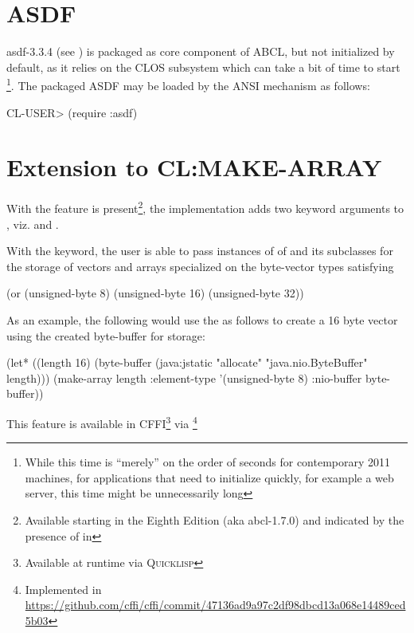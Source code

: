 \documentclass[10pt]{book}
\begin{document}
\section{ASDF}

asdf-3.3.4 (see \cite{asdf}) is packaged as core component of \textsc{ABCL},
but not initialized by default, as it relies on the \textsc{CLOS} subsystem
which can take a bit of time to start \footnote{While this time is
  ``merely'' on the order of seconds for contemporary 2011 machines,
  for applications that need to initialize quickly, for example a web
  server, this time might be unnecessarily long}.  The packaged \textsc{ASDF}
may be loaded by the \textsc{ANSI}  mechanism as
follows:

\begin{listing-lisp}
CL-USER> (require :asdf)
\end{listing-lisp}

\section{Extension to CL:MAKE-ARRAY}
\label{sec:make-array}

With the  feature is present\footnote{Available starting in
the Eighth Edition (aka abcl-1.7.0) and indicated by the presence of
 in }, the implementation adds two
keyword arguments to , viz.  and
.

With the  keyword, the user is able to pass
instances of of  and its subclasses for the
storage of vectors and arrays specialized on the byte-vector
types satisfying

\begin{listing-lisp}
  (or
    (unsigned-byte 8)
    (unsigned-byte 16)
    (unsigned-byte 32))
\end{listing-lisp}

As an example, the following would use the  as
follows to create a 16 byte vector using the created byte-buffer for
storage:

\begin{listing-lisp}
  (let* ((length 16)
         (byte-buffer (java:jstatic "allocate" "java.nio.ByteBuffer" length)))
    (make-array length :element-type '(unsigned-byte 8) :nio-buffer byte-buffer))
\end{listing-lisp}

This feature is available in CFFI\footnote{Available at runtime via
\textsc{Quicklisp}} via
\footnote{Implemented in
\url{https://github.com/cffi/cffi/commit/47136ad9a97c2df98dbcd13a068e14489ced5b03}}
\end{document}
